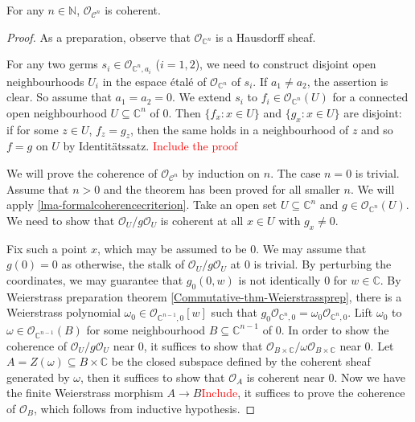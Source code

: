\begin{lemma}[Oka]\label{lma-Okacoh}
    For any $n\in \mathbb{N}$, $\mathcal{O}_{\mathcal{C}^n}$ is coherent.
\end{lemma}
\begin{proof}
    As a preparation, observe that $\mathcal{O}_{\mathbb{C}^n}$ is a Hausdorff sheaf.
    
    For any two germs $s_i\in \mathcal{O}_{\mathbb{C}^n,a_i}$ ($i=1,2$), we need to construct disjoint open neighbourhoods $U_i$ in the espace étalé of $\mathcal{O}_{\mathbb{C}^n}$ of $s_i$. If $a_1\neq a_2$, the assertion is clear. So assume that $a_1=a_2=0$. We extend $s_i$ to $f_i\in \mathcal{O}_{\mathbb{C}^n}(U)$ for a connected open neighbourhood $U\subseteq \mathbb{C}^n$ of $0$. Then $\{f_x:x\in U\}$ and $\{g_x:x\in U\}$ are disjoint: if for some $z\in U$, $f_z=g_z$, then the same holds in a neighbourhood of $z$ and so $f=g$ on $U$ by Identitätssatz. \textcolor{red}{Include the proof}

    We will prove the coherence of $\mathcal{O}_{\mathcal{C}^n}$ by induction on $n$. The case $n=0$ is trivial. Assume that $n>0$ and the theorem has been proved for all smaller $n$. We will apply \cref{lma-formalcoherencecriterion}. Take an open set $U\subseteq \mathbb{C}^n$ and $g\in \mathcal{O}_{\mathbb{C}^n}(U)$. We need to show that $\mathcal{O}_U/g\mathcal{O}_U$ is coherent at all $x\in U$ with $g_x\neq 0$.

    Fix such a point $x$, which may be assumed to be $0$. We may assume that $g(0)=0$ as otherwise, the stalk of $\mathcal{O}_U/g\mathcal{O}_U$ at $0$ is trivial. By perturbing the coordinates, we may guarantee that $g_0(0,w)$ is not identically $0$ for $w\in \mathbb{C}$. By Weierstrass preparation theorem \cref{Commutative-thm-Weierstrassprep}, there is a Weierstrass polynomial $\omega_0\in \mathcal{O}_{\mathbb{C}^{n-1},0}[w]$ such that $g_0\mathcal{O}_{\mathbb{C}^n,0}=\omega_0\mathcal{O}_{\mathbb{C}^n,0}$. Lift $\omega_0$ to $\omega\in \mathcal{O}_{\mathbb{C}^{n-1}}(B)$ for some neighbourhood $B\subseteq \mathbb{C}^{n-1}$ of $0$. In order to show the coherence of $\mathcal{O}_U/g\mathcal{O}_U$ near $0$, it suffices to show that $\mathcal{O}_{B\times \mathbb{C}}/\omega \mathcal{O}_{B\times \mathbb{C}}$ near $0$. Let $A=Z(\omega)\subseteq B\times \mathbb{C}$ be the closed subspace defined by the coherent sheaf generated by $\omega$, then it suffices to show that $\mathcal{O}_{A}$ is coherent near $0$. Now we have the finite Weierstrass morphism $A\rightarrow B$\textcolor{red}{Include}, it suffices to prove the coherence of $\mathcal{O}_B$, which follows from inductive hypothesis.
\end{proof}
